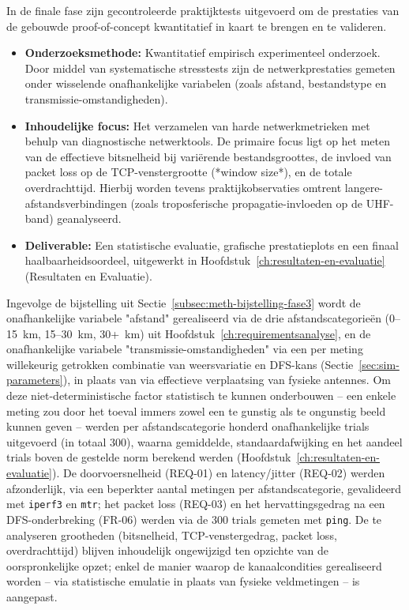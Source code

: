 In de finale fase zijn gecontroleerde praktijktests uitgevoerd om de prestaties van de 
gebouwde proof-of-concept kwantitatief in kaart te brengen en te valideren.
 
\begin{itemize}
    \item \textbf{Onderzoeksmethode:} Kwantitatief empirisch experimenteel onderzoek. 
    Door middel van systematische stresstests zijn de netwerkprestaties gemeten onder 
    wisselende onafhankelijke variabelen (zoals afstand, bestandstype en transmissie-omstandigheden).
    \item \textbf{Inhoudelijke focus:} Het verzamelen van harde netwerkmetrieken met behulp van 
    diagnostische netwerktools. De primaire focus ligt op het meten van de effectieve bitsnelheid 
    bij variërende bestandsgroottes, de invloed van packet loss op de TCP-venstergrootte (*window size*), 
    en de totale overdrachttijd. Hierbij worden tevens praktijkobservaties omtrent langere-afstandsverbindingen 
    (zoals troposferische propagatie-invloeden op de UHF-band) geanalyseerd.
    \item \textbf{Deliverable:} Een statistische evaluatie, grafische prestatieplots en een finaal 
    haalbaarheidsoordeel, uitgewerkt in Hoofdstuk~\ref{ch:resultaten-en-evaluatie} (Resultaten en Evaluatie).
\end{itemize}
 
Ingevolge de bijstelling uit Sectie~\ref{subsec:meth-bijstelling-fase3} wordt de
onafhankelijke variabele "afstand" gerealiseerd via de drie afstandscategorieën
(0--15~km, 15--30~km, 30+~km) uit Hoofdstuk~\ref{ch:requirementsanalyse}, en de
onafhankelijke variabele "transmissie-omstandigheden" via een per meting willekeurig
getrokken combinatie van weersvariatie en DFS-kans (Sectie~\ref{sec:sim-parameters}), in
plaats van via effectieve verplaatsing van fysieke antennes. Om deze
niet-deterministische factor statistisch te kunnen onderbouwen -- een enkele meting zou
door het toeval immers zowel een te gunstig als te ongunstig beeld kunnen geven -- werden
per afstandscategorie honderd onafhankelijke trials uitgevoerd (in totaal 300), waarna
gemiddelde, standaardafwijking en het aandeel trials boven de gestelde norm berekend
werden (Hoofdstuk~\ref{ch:resultaten-en-evaluatie}). De doorvoersnelheid (REQ-01) en
latency/jitter (REQ-02) werden afzonderlijk, via een beperkter aantal metingen per
afstandscategorie, gevalideerd met \texttt{iperf3} en \texttt{mtr}; het packet loss
(REQ-03) en het hervattingsgedrag na een DFS-onderbreking (FR-06) werden via de 300
trials gemeten met \texttt{ping}. De te analyseren grootheden (bitsnelheid,
TCP-venstergedrag, packet loss, overdrachttijd) blijven inhoudelijk ongewijzigd ten
opzichte van de oorspronkelijke opzet; enkel de manier waarop de kanaalcondities
gerealiseerd worden -- via statistische emulatie in plaats van fysieke veldmetingen --
is aangepast.
 
